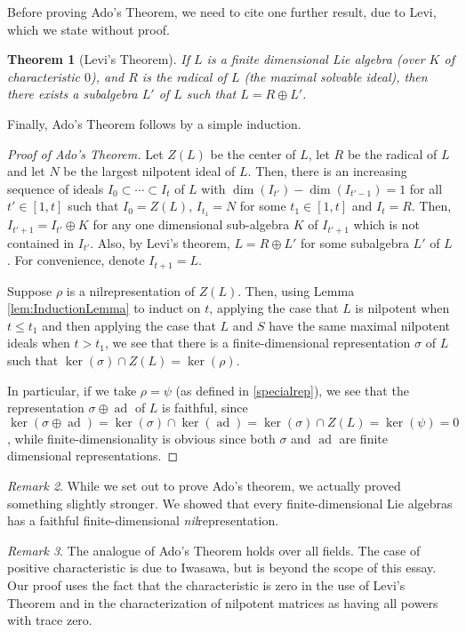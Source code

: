 \documentclass[10pt]{amsart}
\newtheorem{thm}{Theorem}[section]
\theoremstyle{definition}
\theoremstyle{remark}
\newtheorem{remark}[thm]{Remark}
\numberwithin{equation}{section}
\DeclareMathOperator{\ad}{ad}
\begin{document}
Before proving Ado's Theorem, we need to cite one further result, due to Levi, which we state without proof.

\begin{thm}[Levi's Theorem] \label{thm:LevisTheorem}
If $L$ is a finite dimensional Lie algebra (over $K$ of characteristic $0$), and $R$ is the radical of $L$ (the maximal solvable ideal), then there exists a subalgebra $L'$ of $L$ such that $L = R \oplus L'$.
\end{thm}

Finally, Ado's Theorem follows by a simple induction.

\begin{proof}[Proof of Ado's Theorem]
Let $Z(L)$ be the center of $L$, let $R$ be the radical of $L$ and let $N$ be the largest nilpotent ideal of $L$. Then, there is an increasing sequence of ideals $I_0 \subset \cdots \subset I_{t}$ of $L$ with $\dim(I_{t'}) - \dim(I_{t'-1}) = 1$ for all $t' \in [1,t]$ such that $I_0 = Z(L)$, $I_{t_1} = N$ for some $t_1 \in [1,t]$ and $I_t = R$. Then, $I_{t'+1} = I_{t'} \oplus K$ for any one dimensional sub-algebra $K$ of $I_{t'+1}$ which is not contained in $I_{t'}$. Also, by Levi's theorem, $L = R \oplus L'$ for some subalgebra $L'$ of $L$. For convenience, denote $I_{t+1} = L$.

Suppose $\rho$ is a nilrepresentation of $Z(L)$. Then, using Lemma \ref{lem:InductionLemma} to induct on $t$, applying the case that $L$ is nilpotent when $t \leq t_{1}$ and then applying the case that $L$ and $S$ have the same maximal nilpotent ideals when $t > t_1$, we see that there is a finite-dimensional representation $\sigma$ of $L$ such that $\ker(\sigma) \cap Z(L) = \ker(\rho)$.

In particular, if we take $\rho = \psi$ (as defined in \eqref{specialrep}), we see that the representation $\sigma \oplus \ad$ of $L$ is faithful, since $\ker(\sigma \oplus \ad) = \ker(\sigma) \cap \ker(\ad) = \ker(\sigma) \cap Z(L) = \ker(\psi) = 0$, while finite-dimensionality is obvious since both $\sigma$ and $\ad$ are finite dimensional representations. 
\end{proof}

\begin{remark}
While we set out to prove Ado's theorem, we actually proved something slightly stronger. We showed that every finite-dimensional Lie algebras has a faithful finite-dimensional \emph{nil}representation.
\end{remark}

\begin{remark}
The analogue of Ado's Theorem holds over all fields. The case of positive characteristic is due to Iwasawa, but is beyond the scope of this essay. Our proof uses the fact that the characteristic is zero in the use of Levi's Theorem and in the characterization of nilpotent matrices as having all powers with trace zero.
\end{remark}
\end{document}
